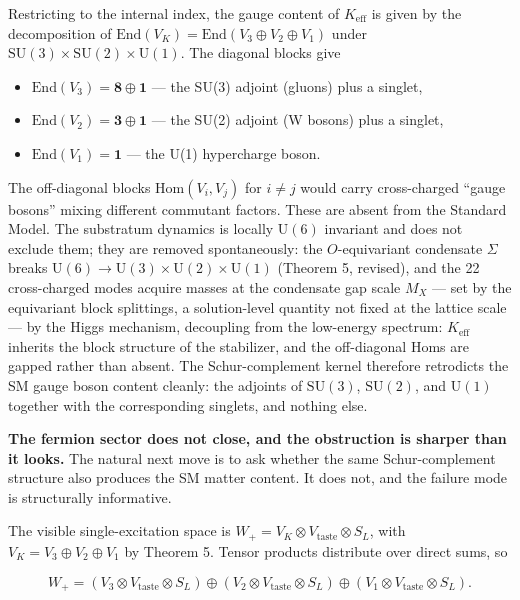 \documentclass[
]{article}
\providecommand{\tightlist}{%
  \setlength{\itemsep}{0pt}\setlength{\parskip}{0pt}}
\begin{document}
Restricting to the internal index, the gauge content of
\(K_{\text{eff}}\) is given by the decomposition of
\(\mathrm{End}(V_K) = \mathrm{End}(V_3 \oplus V_2 \oplus V_1)\) under
\(\mathrm{SU}(3) \times \mathrm{SU}(2) \times \mathrm{U}(1)\). The
diagonal blocks give

\begin{itemize}
\tightlist
\item
  \(\mathrm{End}(V_3) = \mathbf{8} \oplus \mathbf{1}\) --- the SU(3)
  adjoint (gluons) plus a singlet,
\item
  \(\mathrm{End}(V_2) = \mathbf{3} \oplus \mathbf{1}\) --- the SU(2)
  adjoint (W bosons) plus a singlet,
\item
  \(\mathrm{End}(V_1) = \mathbf{1}\) --- the U(1) hypercharge boson.
\end{itemize}

The off-diagonal blocks \(\mathrm{Hom}(V_i, V_j)\) for \(i \neq j\)
would carry cross-charged ``gauge bosons'' mixing different commutant
factors. These are absent from the Standard Model. The substratum
dynamics is locally \(\mathrm{U}(6)\) invariant and does not exclude
them; they are removed spontaneously: the \(O\)-equivariant condensate
\(\Sigma\) breaks
\(\mathrm{U}(6) \to \mathrm{U}(3) \times \mathrm{U}(2) \times \mathrm{U}(1)\)
(Theorem 5, revised), and the 22 cross-charged modes acquire masses at
the condensate gap scale \(M_X\) --- set by the equivariant block
splittings, a solution-level quantity not fixed at the lattice scale ---
by the Higgs mechanism, decoupling from the low-energy spectrum:
\(K_{\text{eff}}\) inherits the block structure of the stabilizer, and
the off-diagonal Homs are gapped rather than absent. The
Schur-complement kernel therefore retrodicts the SM gauge boson content
cleanly: the adjoints of \(\mathrm{SU}(3)\), \(\mathrm{SU}(2)\), and
\(\mathrm{U}(1)\) together with the corresponding singlets, and nothing
else.

\textbf{The fermion sector does not close, and the obstruction is
sharper than it looks.} The natural next move is to ask whether the same
Schur-complement structure also produces the SM matter content. It does
not, and the failure mode is structurally informative.

The visible single-excitation space is
\(W_+ = V_K \otimes V_{\text{taste}} \otimes S_L\), with
\(V_K = V_3 \oplus V_2 \oplus V_1\) by Theorem 5. Tensor products
distribute over direct sums, so

\[W_+ = (V_3 \otimes V_{\text{taste}} \otimes S_L) \oplus (V_2 \otimes V_{\text{taste}} \otimes S_L) \oplus (V_1 \otimes V_{\text{taste}} \otimes S_L).\]
\end{document}
